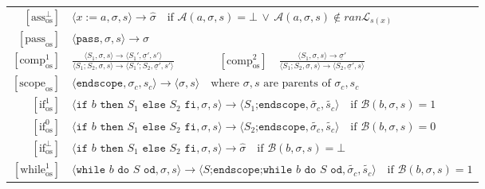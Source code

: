 \documentclass{article}
\begin{document}
\begin{table}[!ht]
{\begin{tabular}{|r l|}
\([ \text{ass}^{\bot}_{\text{os}} ]\) &
\(\langle x \;\texttt{:=}\; a, \sigma,  s \rangle \rightarrow \hat{\sigma} \quad \text{if } \mathcal{A}(a, \sigma, s) = \bot \,\lor\, \mathcal{A}(a, \sigma, s) \notin ran\mathcal{L}_{s(x)} \) \\

\([ \text{pass}_{\text{os}} ]\) &
\(\langle \texttt{pass}, \sigma, s \rangle \rightarrow \sigma\) \\

\([ \text{comp}^1_{\text{os}} ]\) &
\(\frac{
  \langle S_1, \sigma, s \rangle \rightarrow  \langle S_1', \underline{\sigma}', s' \rangle 
}{
  \langle S_1 ; S_2, \sigma, s \rangle \rightarrow \langle S_1' ; S_2, \underline{\sigma}', s' \rangle
} \qquad\qquad
[ \text{comp}^2_{\text{os}} ] \quad
\frac{
  \langle S_1, \sigma, s \rangle \rightarrow \underline{\sigma}'
}{
  \langle S_1 ; S_2, \sigma, s \rangle \rightarrow \langle S_2, \underline{\sigma}', s \rangle
}\) \\[6pt]

\([ \text{scope}_{\text{os}} ]\) &
\(\langle \texttt{endscope}, \sigma_c, s_c \rangle \rightarrow \langle \sigma, s \rangle
\quad \text{where $\sigma,s$ are parents of $\sigma_c, s_c$}\) \\

\([ \text{if}^{1}_{\text{os}} ]\) &
\(\langle \texttt{if } b \texttt{ then } S_1 \texttt{ else } S_2 \texttt{ fi}, \sigma, s  \rangle \rightarrow \langle S_1\texttt{;endscope}, \tilde{\sigma_c}, \tilde{s_c} \rangle
\quad \text{if } \mathcal{B}(b, \sigma, s) = 1\) \\

\([ \text{if}^{0}_{\text{os}} ]\) &
\(\langle \texttt{if } b \texttt{ then } S_1 \texttt{ else } S_2 \texttt{ fi}, \sigma, s  \rangle \rightarrow \langle S_2\texttt{;endscope}, \tilde{\sigma_c}, \tilde{s_c} \rangle
\quad \text{if } \mathcal{B}(b, \sigma, s) = 0\) \\

\([ \text{if}^{\bot}_{\text{os}} ]\) &
\(\langle \texttt{if } b \texttt{ then } S_1 \texttt{ else } S_2 \texttt{ fi}, \sigma, s  \rangle \rightarrow \hat{\sigma}
\quad \text{if } \mathcal{B}(b, \sigma, s) = \bot\) \\

\([ \text{while}^{1}_{\text{os}} ]\) &
\(\langle \texttt{while } b \texttt{ do } S \texttt{ od}, \sigma, s \rangle \rightarrow \langle S\texttt{;endscope;}\texttt{while } b \texttt{ do } S \texttt{ od}, \tilde{\sigma_c}, \tilde{s_c} \rangle
\quad \text{if } \mathcal{B}(b, \sigma, s) = 1\) \\


\end{tabular}}
\end{table}
\end{document}
